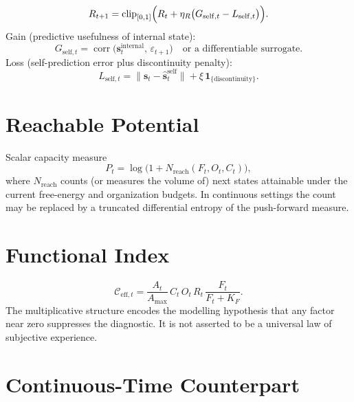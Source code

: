 \documentclass[11pt,a4paper]{article}
\begin{document}
\begin{equation}
R_{t+1}=\operatorname{clip}_{[0,1]}\Bigl(R_t+\eta_R\bigl(G_{\mathrm{self},t}-L_{\mathrm{self},t}\bigr)\Bigr).
\end{equation}
Gain (predictive usefulness of internal state):
\[
G_{\mathrm{self},t}=\operatorname{corr}\bigl(\mathbf{s}_t^{\mathrm{internal}},\,\varepsilon_{t+1}\bigr)
\quad\text{or a differentiable surrogate}.
\]
Loss (self-prediction error plus discontinuity penalty):
\[
L_{\mathrm{self},t}=\|\mathbf{s}_t-\widehat{\mathbf{s}}_t^{\mathrm{self}}\|+\xi\,\mathbf{1}_{\{\text{discontinuity}\}}.
\]

\section{Reachable Potential}

Scalar capacity measure
\begin{equation}
P_t=\log\bigl(1+N_{\mathrm{reach}}(F_t,O_t,C_t)\bigr),
\end{equation}
where \(N_{\mathrm{reach}}\) counts (or measures the volume of) next states attainable under the current free-energy and organization budgets. In continuous settings the count may be replaced by a truncated differential entropy of the push-forward measure.

\section{Functional Index}

\begin{equation}
\mathcal{C}_{\mathrm{eff},t}=\frac{A_t}{A_{\max}}\,C_t\,O_t\,R_t\,\frac{F_t}{F_t+K_F}.
\end{equation}
The multiplicative structure encodes the modelling hypothesis that any factor near zero suppresses the diagnostic. It is not asserted to be a universal law of subjective experience.

\section{Continuous-Time Counterpart}
\end{document}
